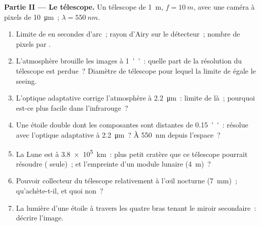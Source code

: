 \begin{problem}
\medskip
\noindent\textbf{Partie II --- Le télescope.}
Un télescope de \qty{1}{m}, $f = \qty{10}{m}$, avec une caméra à pixels de \qty{10}{\micro m}~;
$\lambda = \qty{550}{nm}$.
\begin{enumerate}[resume]
  \item Limite de  en secondes d'arc~; rayon d'Airy sur le
        détecteur~; nombre de pixels par .
  \item L'atmosphère brouille les images à \qty{1}{''}~: quelle part de la
        résolution du télescope est perdue~? Diamètre de télescope pour lequel
        la limite de  égale le seeing.
  \item L'optique adaptative corrige l'atmosphère à \qty{2.2}{\micro m}~:
        limite de  là~; pourquoi est-ce plus facile dans l'infrarouge~?
  \item Une étoile double dont les composantes sont distantes de \qty{0.15}{''}~: résolue avec
        l'optique adaptative à \qty{2.2}{\micro m}~? À \qty{550}{nm} depuis l'espace~?
  \item La Lune est à \qty{3.8e5}{km}~: plus petit cratère que ce télescope
        pourrait résoudre ( seule)~; et l'empreinte d'un module lunaire
        (\qty{4}{m})~?
  \item Pouvoir collecteur du télescope relativement à
        l'œil nocturne (\qty{7}{mm})~; qu'achète-t-il, et quoi non~?
  \item La lumière d'une étoile à travers les quatre bras tenant le
        miroir secondaire~: décrire l'image.
\end{enumerate}


\end{problem}
